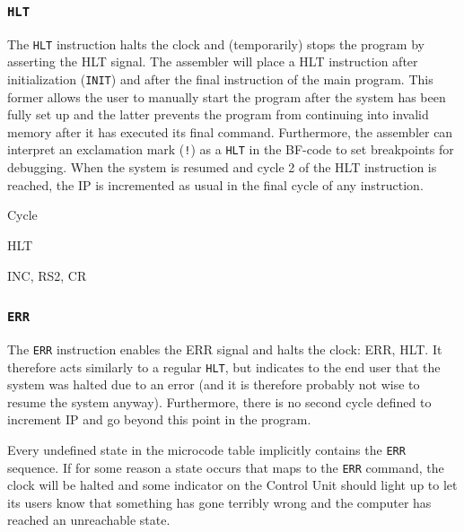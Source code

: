 \subsubsection{\texttt{HLT}}
The \texttt{HLT} instruction halts the clock and (temporarily) stops the program by asserting the HLT signal. The assembler will place a HLT instruction after initialization (\texttt{INIT}) and after the final instruction of the main program. This former allows the user to manually start the program after the system has been fully set up and the latter prevents the program from continuing into invalid memory after it has executed its final command. Furthermore, the assembler can interpret an exclamation mark (\texttt{!}) as a \texttt{HLT} in the BF-code to set breakpoints for debugging. When the system is resumed and cycle 2 of the HLT instruction is reached, the IP is incremented as usual in the final cycle of any instruction.

\begin{labeledenum}{Cycle}
\item HLT
\item INC, RS2, CR
\end{labeledenum}

\subsubsection{\texttt{ERR}}
The \texttt{ERR} instruction enables the ERR signal and halts the clock: ERR, HLT. It therefore acts similarly to a regular \texttt{HLT}, but indicates to the end user that the system was halted due to an error (and it is therefore probably not wise to resume the system anyway). Furthermore, there is no second cycle defined to increment IP and go beyond this point in the program.

Every undefined state in the microcode table implicitly contains the \texttt{ERR} sequence. If for some reason a state occurs that maps to the \texttt{ERR} command, the clock will be halted and some indicator on the Control Unit should light up to let its users know that something has gone terribly wrong and the computer has reached an unreachable state.





